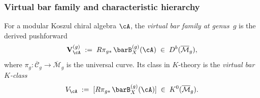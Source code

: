 \subsubsection{Virtual bar family and characteristic hierarchy}
\label{subsubsec:virtual-bar-k-class}

\begin{definition}
\label{def:virtual-bar-k-class}
For a modular Koszul chiral algebra $\cA$, the
\emph{virtual bar family at genus~$g$} is the derived pushforward
\begin{equation}\label{eq:virtual-bar-k-class}
\mathbf{V}_{\cA}^{(g)}
\;:=\;
R\pi_{g*}\, \barB^{(g)}_X(\cA)
\;\in\; D^b(\overline{\mathcal{M}}_g),
\end{equation}
where $\pi_g\colon \overline{\mathcal{C}}_g \to
\overline{\mathcal{M}}_g$ is the universal curve. Its class in
$K$-theory is the \emph{virtual bar $K$-class}
\begin{equation}\label{eq:V-A-K-class}
V_{\cA}
\;:=\;
[R\pi_{g*}\, \barB^{(g)}_X(\cA)]
\;\in\; K^0(\overline{\mathcal{M}}_g).
\end{equation}
\end{definition}


